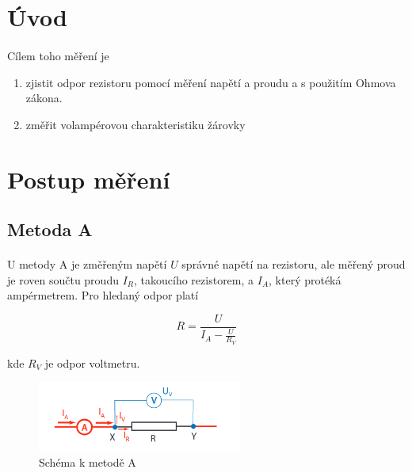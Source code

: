 \documentclass[a4paper,11pt]{article}
\begin{document}
\section{Úvod}

    \paragraph{} Cílem toho měření je
    
    \begin{enumerate}
        \item zjistit odpor rezistoru pomocí měření napětí a proudu a s použitím Ohmova zákona.
        \item změřit volampérovou charakteristiku žárovky
    \end{enumerate}

\section{Postup měření}

    \subsection{Metoda A}

        \paragraph{} U metody A je změřeným napětí $U$ správné napětí na rezistoru, ale 
        měřený proud je roven součtu proudu $I_{R}$, takoucího rezistorem, a $I_{A}$,
        který protéká ampérmetrem. Pro hledaný odpor platí

        \begin{equation} 
            R = \frac{U}{I_{A} - \frac{U}{R_{V}}}
        \end{equation}

        kde $R_{V}$ je odpor voltmetru.
        
        \begin{figure}[h]
            \centering
            \includegraphics[width=0.6\textwidth]{metoda_a.png}
            \caption{Schéma k metodě A}
            \label{fig:method_a}
        \end{figure}
\end{document}
